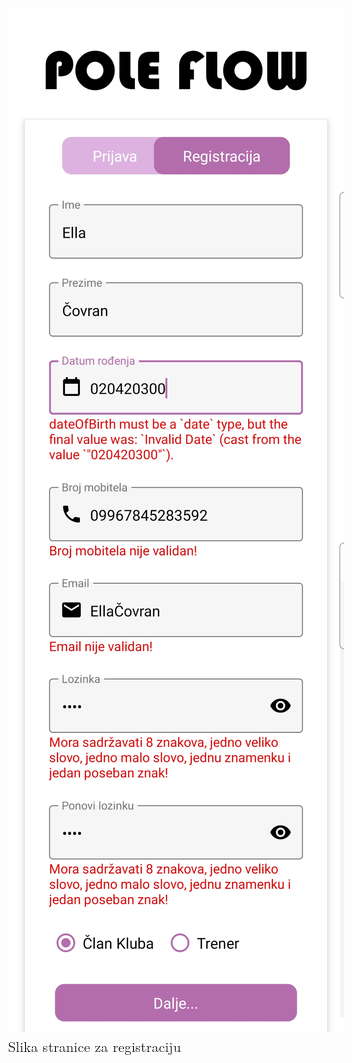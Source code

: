 \documentclass[times, utf8, zavrsni]{fer}
\begin{document}
			\begin{figure}[H]
        			\includegraphics[scale=0.2]{slike/App_registracija.jpg}
        			\centering
        			\caption{Slika stranice za registraciju}
        			\label{fig:promjene}
        		\end{figure}
			    
\end{document}
